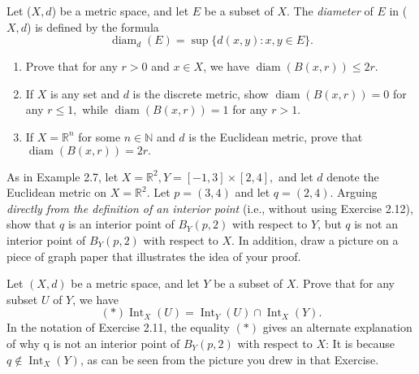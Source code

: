 \documentclass[12pt,letterpaper,boxed]{hmcpset}
\DeclareMathOperator{\diam}{diam}
\DeclareMathOperator{\Int}{Int}
\begin{document}
\begin{problem}[Exercise 2.8.]
Let ($X, d$) be a metric space, and let $E$ be a subset of $X$. The \textit{diameter} of $E$ in ($X,d$) is defined by the formula $$\diam_{d}(E) = \sup\{d(x,y) : x,y \in E\}.$$

\vspace{-2mm}
\begin{enumerate}
	\itemsep0em
	\item Prove that for any $r > 0$ and $x \in X$, we have $\diam(B(x,r))\leq 2r.$
	\item If $X$ is any set and $d$ is the discrete metric, show $\diam(B(x, r)) = 0$ for any $r \leq 1,$ while $\diam(B(x,r)) = 1$ for any $r > 1$.
	\item If $X = \mathbb{R}^{n}$ for some $n \in \mathbb{N}$ and $d$ is the Euclidean metric, prove that $\diam(B(x,r)) = 2r.$ 
\end{enumerate}

\end{problem}
\begin{solution}

\end{solution}

\begin{problem}[Exercise 2.11.]
As in Example 2.7, let $X = \mathbb{R}^{2}, Y = [-1,3]\times[2,4],$ and let $d$ denote the Euclidean metric on $X = \mathbb{R}^{2}.$ Let $p = (3,4)$ and let $q = (2, 4)$. Arguing \textit{directly from the definition of an interior point} (i.e., without using Exercise 2.12), show that $q$ is an interior point of $B_{Y}(p,2)$ with respect to $Y$, but $q$ is not an interior point of $B_{Y}(p,2)$ with respect to $X$. In addition, draw a picture on a piece of graph paper that illustrates the idea of your proof.
\end{problem}
\begin{solution}

\end{solution}


\begin{problem}[Exercise 2.12.]
Let $(X, d)$ be a metric space, and let $Y$ be a subset of $X$. Prove that for any subset $U$ of $Y$, we have $$(*) \Int_{X}(U) = \Int_{Y}(U)\cap\Int_{X}(Y).$$
In the notation of Exercise 2.11, the equality $(*)$ gives an alternate explanation of why q is not an interior point of $B_{Y}(p, 2)$ with respect to $X$: It is because $q \notin \Int_{X}(Y)$, as can be seen from the picture you drew in that Exercise.
\end{problem}
\begin{solution}

\end{solution}
\end{document}
